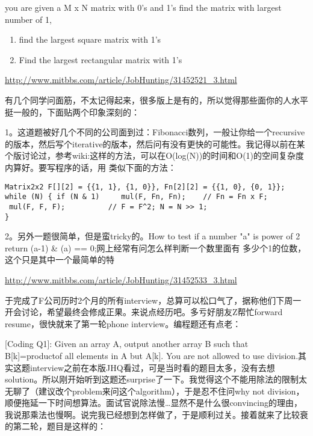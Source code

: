\documentclass[12pt]{book}
\begin{document}
you are given a M x N matrix with 0's and 1's find the matrix with largest number of 1,

\begin{enumerate}
\item find the largest square matrix with 1's

\item Find the largest rectangular matrix with 1's
\end{enumerate}

\url{http://www.mitbbs.com/article/JobHunting/31452521_3.html}

有几个同学问面筋，不太记得起来，很多版上是有的，所以觉得那些面你的人水平挺一般的，下面贴两个印象深刻的：

1。这道题被好几个不同的公司面到过：Fibonacci数列，一般让你给一个recursive的版本，然后写个iterative的版本，然后问有没有更快的可能性。我记得以前在某个版讨论过，参考wiki:这样的方法，可以在O(log(N))的时间和O(1)的空间复杂度内算好。要写程序的话，用
类似下面的方法：
\lstset{language=java,label= ,caption= ,numbers=none}
\begin{lstlisting}
Matrix2x2 F[][2] = {{1, 1}, {1, 0}}, Fn[2][2] = {{1, 0}, {0, 1}};
while (N) { if (N & 1)     mul(F, Fn, Fn);    // Fn = Fn x F;
 mul(F, F, F);          // F = F^2; N = N >> 1;
}
\end{lstlisting}

2。另外一题很简单，但是蛮tricky的。How to test if a number "a" is
power of 2 return (a-1) \& (a) == 0;网上经常有问怎么样判断一个数里面有
多少个1的位数，这个只是其中一个最简单的特

\url{http://www.mitbbs.com/article/JobHunting/31452533_3.html}

于完成了F公司历时2个月的所有interview，总算可以松口气了，据称他们下周一开会讨论，希望最终会修成正果。来说点经历吧。多亏好朋友Z帮忙forward resume，很快就来了第一轮phone interview。编程题还有点老：

[Coding Q1]: Given an array A, output another array B such that B[k]=productof all elements in A but A[k]. You are not allowed to use division.其实这题interview之前在本版JHQ看过，可是当时看的题目太多，没有去想solution。所以刚开始听到这题还surprise了一下。我觉得这个不能用除法的限制太无聊了（建议改个problem来问这个algorithm），于是忍不住问why not division，顺便拖延一下时间想算法。面试官说除法慢\ldots{}显然不是什么很convincing的理由，我说那乘法也慢啊。说完我已经想到怎样做了，于是顺利过关。接着就来了比较衰的第二轮，题目是这样的：
\end{document}
